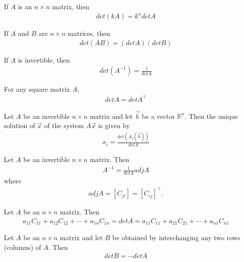 \documentclass{article}
\begin{document}
\begin{theorem}
	If $A$ is an $n\times n$ matrix, then
	\begin{align*}
		det(kA) = k^n det A
	\end{align*}
\end{theorem}
\begin{theorem}
	If $A$ and $B$ are $n\times n$ matrices, then
	\begin{align*}
		det(AB) = (det A)(det B)
	\end{align*}
\end{theorem}
\begin{theorem}
	If $A$ is invertible, then
	\begin{align*}
		det(A^{-1})=\frac{1}{det A}
	\end{align*}
\end{theorem}
\begin{theorem}
	For any square matrix $A$,
	\begin{align*}
		det A = det A^\intercal
	\end{align*}
\end{theorem}
\begin{theorem}
	Let $A$ be an invertible $n\times n$ matrix and let $\vec b$ be a vector $\mathbb{R}^n$. Then the unique solution of $\vec x$ of the system $A\vec x$ is given by
	\begin{align*}
		x_i = \frac{det(A_i(\vec b))}{det A}
	\end{align*}
\end{theorem}
\begin{theorem}
	Let $A$ be an invertible $n\times n$ matrix. Then
	\begin{align*}
		A^{-1}=\frac{1}{det A}adj A
	\end{align*}
	where
	\begin{align*}
		adj A = [C_{ji}] = [C_{ij}]^\intercal.
	\end{align*}
\end{theorem}
\begin{theorem}
	Let $A$ be an $n\times n$ matrix. Then
	\begin{align*}
		a_{11}C_{11}+a_{12}C_{12}+\cdots+a_{1n}C_{1n}= det A = a_{11}C_{11}+a_{21}C_{21} + \cdots + a_{n1}C_{n1}
	\end{align*}
\end{theorem}
\begin{theorem}
	Let $A$ be an $n\times n$ matrix and let $B$ be obtained by interchanging any two rows (columns) of $A$. Then
	\begin{align*}
		det B = - det A
	\end{align*}
\end{theorem}
\end{document}
